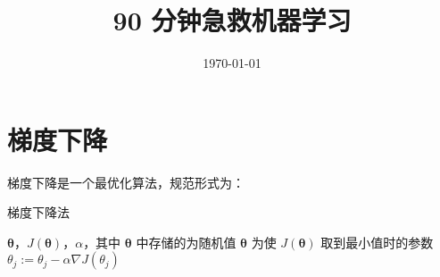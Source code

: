 \documentclass[normal, cyan, en]{elegantnote}
\title{90 分钟急救机器学习}
\date{\today}
\begin{document}
\maketitle
\tableofcontents
\newpage

\section{梯度下降}
梯度下降是一个最优化算法，规范形式为：

\begin{algorithm}[H]
    \renewcommand{\algorithmicrequire}{\textbf{Input:}}
	\renewcommand{\algorithmicensure}{\textbf{Output:}}
    \caption{梯度下降法}
    \begin{algorithmic}[1]
        \REQUIRE $\boldsymbol{\theta}$，$J(\boldsymbol{\theta})$，$\alpha$，其中 $\boldsymbol{\theta}$ 中存储的为随机值
        \ENSURE $\boldsymbol{\theta}$ 为使 $J(\boldsymbol{\theta})$ 取到最小值时的参数
                \STATE $\theta_j := \theta_j - \alpha\nabla J(\theta_j)$
            \ENDFOR
        \ENDWHILE
    \end{algorithmic}
\end{algorithm}






















\end{document}
